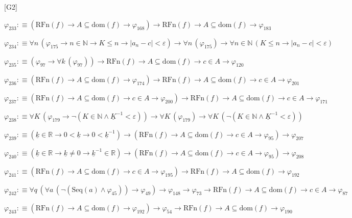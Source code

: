 \begin{fullproof}{[G2]}
\begin{abbrevlist}
\item $\varphi_{233} :\equiv (\mathrm{RFn}(f) \to A \subseteq \mathrm{dom}(f) \to \varphi_{168}) \to \mathrm{RFn}(f) \to A \subseteq \mathrm{dom}(f) \to \varphi_{183}$
\item $\varphi_{234} :\equiv \forall n\,(\varphi_{175} \to n \in \mathbb{N} \to K \leq n \to \lvert a_{n} - c \rvert < \varepsilon) \to \forall n\,(\varphi_{175}) \to \forall n \in \mathbb{N}\,(K \leq n \to \lvert a_{n} - c \rvert < \varepsilon)$
\item $\varphi_{235} :\equiv (\varphi_{97} \to \forall k\,(\varphi_{97})) \to \mathrm{RFn}(f) \to A \subseteq \mathrm{dom}(f) \to c \in A \to \varphi_{120}$
\item $\varphi_{236} :\equiv (\mathrm{RFn}(f) \to A \subseteq \mathrm{dom}(f) \to \varphi_{174}) \to \mathrm{RFn}(f) \to A \subseteq \mathrm{dom}(f) \to c \in A \to \varphi_{201}$
\item $\varphi_{237} :\equiv (\mathrm{RFn}(f) \to A \subseteq \mathrm{dom}(f) \to c \in A \to \varphi_{200}) \to \mathrm{RFn}(f) \to A \subseteq \mathrm{dom}(f) \to c \in A \to \varphi_{171}$
\item $\varphi_{238} :\equiv \forall K\,(\varphi_{179} \to \neg (K \in \mathbb{N} \land \underline{K}^{-1} < \varepsilon)) \to \forall K\,(\varphi_{179}) \to \forall K\,(\neg (K \in \mathbb{N} \land \underline{K}^{-1} < \varepsilon))$
\item $\varphi_{239} :\equiv (\underline{k} \in \mathbb{R} \to 0 < \underline{k} \to 0 < \underline{k}^{-1}) \to (\mathrm{RFn}(f) \to A \subseteq \mathrm{dom}(f) \to c \in A \to \varphi_{95}) \to \varphi_{207}$
\item $\varphi_{240} :\equiv (\underline{k} \in \mathbb{R} \to \underline{k} \neq 0 \to \underline{k}^{-1} \in \mathbb{R}) \to (\mathrm{RFn}(f) \to A \subseteq \mathrm{dom}(f) \to c \in A \to \varphi_{95}) \to \varphi_{208}$
\item $\varphi_{241} :\equiv (\mathrm{RFn}(f) \to A \subseteq \mathrm{dom}(f) \to c \in A \to \varphi_{195}) \to \mathrm{RFn}(f) \to A \subseteq \mathrm{dom}(f) \to \varphi_{192}$
\item $\varphi_{242} :\equiv \forall q\,(\forall a\,(\neg (\mathrm{Seq}(a) \land \varphi_{45})) \to \varphi_{49}) \to \varphi_{148} \to \varphi_{73} \to \mathrm{RFn}(f) \to A \subseteq \mathrm{dom}(f) \to c \in A \to \varphi_{87}$
\item $\varphi_{243} :\equiv (\mathrm{RFn}(f) \to A \subseteq \mathrm{dom}(f) \to \varphi_{192}) \to \varphi_{54} \to \mathrm{RFn}(f) \to A \subseteq \mathrm{dom}(f) \to \varphi_{190}$

\end{abbrevlist}
\end{fullproof}
